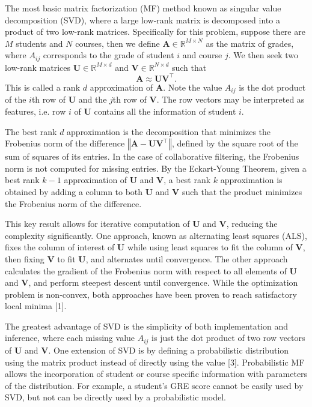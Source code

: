 \documentclass[12pt]{article}
\begin{document}
The most basic matrix factorization (MF) method
known as singular value decomposition (SVD),
where a large low-rank matrix 
is decomposed into a product of two low-rank matrices.
Specifically for this problem, 
suppose there are $M$ students and $N$ courses,
then we define $\mathbf{A} \in \mathbb{R}^{M \times N}$ 
as the matrix of grades,
where $A_{ij}$ corresponds to the grade of 
student $i$ and course $j$.
We then seek two low-rank matrices 
$\mathbf{U} \in \mathbb{R}^{M \times d}$ 
and $\mathbf{V} \in \mathbb{R}^{N \times d}$ such that
%
\begin{equation}
	\mathbf{A} \approx \mathbf{UV}^\top .
\end{equation}
%
This is called a rank $d$ approximation of $\mathbf{A}$.
Note the value $A_{ij}$ is the dot product of
the $i$th row of $\mathbf{U}$ and 
the $j$th row of $\mathbf{V}$.
The row vectors may be interpreted as features,
i.e. row $i$ of $\mathbf{U}$ contains all the information
of student $i$.

The best rank $d$ approximation is the decomposition
that minimizes the Frobenius norm of the difference
$\left\Vert \mathbf{A - UV}^\top \right\Vert$,
defined by the square root of the
sum of squares of its entries.
In the case of collaborative filtering,
the Frobenius norm is not computed for missing entries.
By the Eckart-Young Theorem, given a best rank $k-1$ approximation
of $\mathbf{U}$ and $\mathbf{V}$, 
a best rank $k$ approximation is obtained by adding
a column to both $\mathbf{U}$ and $\mathbf{V}$
such that the product minimizes 
the Frobenius norm of the difference.

This key result allows for iterative computation of 
$\mathbf{U}$ and $\mathbf{V}$,
reducing the complexity significantly.
One approach, known as alternating least squares (ALS),
fixes the column of interest of $\mathbf{U}$ 
while using least squares
to fit the column of $\mathbf{V}$, 
then fixing $\mathbf{V}$ to fit $\mathbf{U}$,
and alternates until convergence.
The other approach calculates the gradient of
the Frobenius norm
with respect to all elements of $\mathbf{U}$ and $\mathbf{V}$,
and perform steepest descent until convergence.
While the optimization problem is non-convex,
both approaches have been proven to reach satisfactory 
local minima [1].

The greatest advantage of SVD is the simplicity of 
both implementation and inference,
where each missing value $A_{ij}$ is just 
the dot product of two row vectors of $\mathbf{U}$
and $\mathbf{V}$.
One extension of SVD is by defining
a probabilistic distribution using the matrix product
instead of directly using the value [3].
Probabilistic MF allows the incorporation of student or course 
specific information with parameters of the distribution.
For example, a student's GRE score cannot be easily
used by SVD, but not can be directly used by a
probabilistic model.
\end{document}
